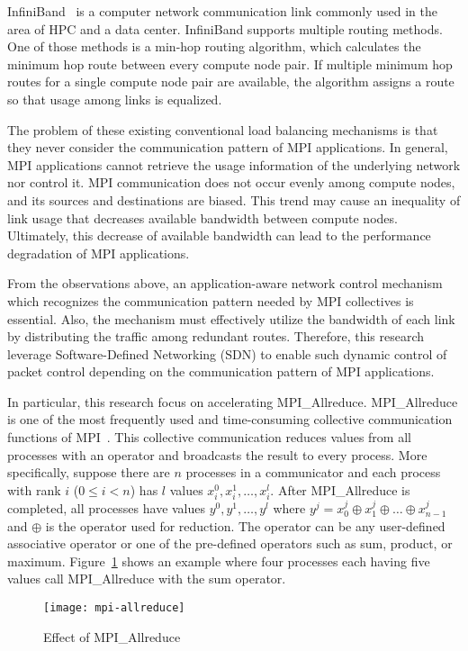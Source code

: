 InfiniBand~\autocite{Buyya2009} is a computer network communication link
commonly used in the area of HPC and a data center. InfiniBand supports
multiple routing methods. One of those methods is a min-hop routing
algorithm, which calculates the minimum hop route between every
compute node pair. If multiple minimum hop routes for a single
compute node pair are available, the algorithm assigns a route so that
usage among links is equalized.

The problem of these existing conventional load balancing mechanisms is
that they never consider the communication pattern of MPI applications. In
general, MPI applications cannot retrieve the usage information of the
underlying network nor control it. MPI communication does not occur evenly
among compute nodes, and its sources and destinations are biased. This trend
may cause an inequality of link usage that decreases available bandwidth
between compute nodes. Ultimately, this decrease of available bandwidth can
lead to the performance degradation of MPI applications.

From the observations above, an application-aware network control mechanism
which recognizes the communication pattern needed by MPI collectives is
essential. Also, the mechanism must effectively utilize the bandwidth of each
link by distributing the traffic among redundant routes. Therefore, this
research leverage Software-Defined Networking (SDN) to enable such dynamic
control of packet control depending on the communication pattern of MPI
applications.

In particular, this research focus on accelerating MPI\_Allreduce.
MPI\_Allreduce is one of the most frequently used and time-consuming
collective communication functions of MPI\@~\cite{Chunduri2018}.
This collective communication reduces values from all
processes with an operator and broadcasts the result to every process.
More specifically, suppose there are $n$ processes in a communicator and
each process with rank $i$ ($0 \leq i < n$) has $l$ values $x_i^0, x_i^1,
\dots, x_i^l$. After MPI\_Allreduce is completed, all processes have values
$y^0, y^1, \dots, y^l$ where $y^j = x_0^j \oplus x_1^j \oplus \dots \oplus
x_{n-1}^j$ and $\oplus$ is the operator used for reduction. The operator can
be any user-defined associative operator or one of the pre-defined operators
such as sum, product, or maximum. Figure~\ref{fig:mpi-allreduce} shows an
example where four processes each having five values call MPI\_Allreduce with
the sum operator.

\begin{figure}
    \centering
    \texttt{[image: mpi-allreduce]}
    \caption{Effect of MPI\_Allreduce}%
    \label{fig:mpi-allreduce}
\end{figure}

